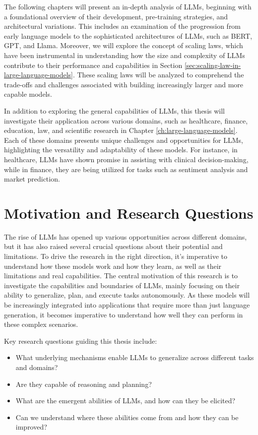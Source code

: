 The following chapters will present an in-depth analysis of LLMs, beginning with a foundational overview of their development, pre-training strategies, and architectural variations.
This includes an examination of the progression from early language models to the sophisticated architectures of LLMs, such as BERT, GPT, and Llama.
Moreover, we will explore the concept of scaling laws, which have been instrumental in understanding how the size and complexity of LLMs contribute to their performance and capabilities in Section \ref{sec:scaling-law-in-large-language-models}.
These scaling laws will be analyzed to comprehend the trade-offs and challenges associated with building increasingly larger and more capable models.

In addition to exploring the general capabilities of LLMs, this thesis will investigate their application across various domains, such as healthcare, finance, education, law, and scientific research in Chapter \ref{ch:large-language-models}.
Each of these domains presents unique challenges and opportunities for LLMs, highlighting the versatility and adaptability of these models.
For instance, in healthcare, LLMs have shown promise in assisting with clinical decision-making, while in finance, they are being utilized for tasks such as sentiment analysis and market prediction.


\section*{Motivation and Research Questions}
The rise of LLMs has opened up various opportunities across different domains, but it has also raised several crucial questions about their potential and limitations.
To drive the research in the right direction, it's imperative to understand how these models work and how they learn, as well as their limitations and real capabilities.
The central motivation of this research is to investigate the capabilities and boundaries of LLMs, mainly focusing on their ability to generalize, plan, and execute tasks autonomously.
As these models will be increasingly integrated into applications that require more than just language generation, it becomes imperative to understand how well they can perform in these complex scenarios.

\noindent Key research questions guiding this thesis include:

\begin{itemize}
	\item What underlying mechanisms enable LLMs to generalize across different tasks and domains?
	\item Are they capable of reasoning and planning?
	\item What are the emergent abilities of LLMs, and how can they be elicited?
	\item Can we understand where these abilities come from and how they can be improved?
\end{itemize}

